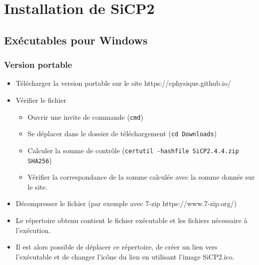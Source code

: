 \section{Installation de SiCP2}
%
\subsection{Exécutables pour Windows}
%
\subsubsection{Version portable}
%
\begin{itemize}[leftmargin=1cm, label=, itemsep=0pt]
%
\item Télécharger la version portable sur le site https://cphysique.github.io/
\item Vérifier le fichier
	\begin{itemize}[leftmargin=1cm, label=, itemsep=0pt]
	\item Ouvrir une invite de commande (\texttt{cmd})
	\item Se déplacer dans le dossier de téléchargement (\texttt{cd Downloads})
	\item Calculer la somme de contrôle (\texttt{certutil -hashfile SiCP2.4.4.zip SHA256})
	\item Vérifier la correspondance de la somme calculée avec la somme donnée sur le site.
	\end{itemize}
\item Décompresser le fichier (par exemple avec 7-zip https://www.7-zip.org/)
\item Le répertoire obtenu contient le fichier exécutable et les fichiers nécessaire à l'exécution.
\item Il est alors possible de déplacer ce répertoire, de créer un lien vers l'exécutable et de changer l'icône du lien en utilisant l'image SiCP2.ico.
\end{itemize}
%
%
